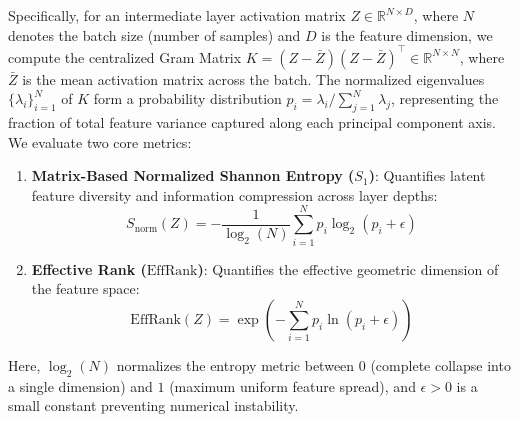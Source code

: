 Specifically, for an intermediate layer activation matrix $Z \in \mathbb{R}^{N \times D}$, where $N$ denotes the batch size (number of samples) and $D$ is the feature dimension, we compute the centralized Gram Matrix $K = (Z - \bar{Z})(Z - \bar{Z})^\top \in \mathbb{R}^{N \times N}$, where $\bar{Z}$ is the mean activation matrix across the batch. The normalized eigenvalues $\{\lambda_i\}_{i=1}^N$ of $K$ form a probability distribution $p_i = \lambda_i / \sum_{j=1}^N \lambda_j$, representing the fraction of total feature variance captured along each principal component axis. We evaluate two core metrics:
\begin{enumerate}
    \item \textbf{Matrix-Based Normalized Shannon Entropy ($S_1$)}: Quantifies latent feature diversity and information compression across layer depths:
    \begin{equation}
    S_{\text{norm}}(Z) = -\frac{1}{\log_2(N)} \sum_{i=1}^N p_i \log_2(p_i + \epsilon)
    \end{equation}
    \item \textbf{Effective Rank ($\text{EffRank}$)}: Quantifies the effective geometric dimension of the feature space:
    \begin{equation}
    \text{EffRank}(Z) = \exp \left( -\sum_{i=1}^N p_i \ln(p_i + \epsilon) \right)
    \end{equation}
\end{enumerate}
Here, $\log_2(N)$ normalizes the entropy metric between $0$ (complete collapse into a single dimension) and $1$ (maximum uniform feature spread), and $\epsilon > 0$ is a small constant preventing numerical instability.
